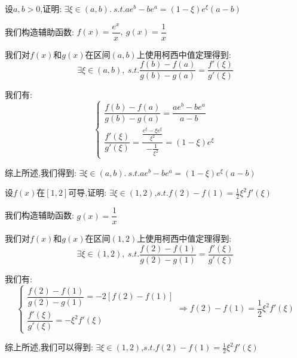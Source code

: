 \begin{proposition}
	设$a,b>0$,证明: $\exists \xi\in(a,b).\ s.t. ae^b-be^a=(1-\xi)e^{\xi}(a-b)$
\end{proposition}
\begin{solution}

	我们构造辅助函数: $f(x)=\dfrac{e^{x}}{x},\ g(x)=\dfrac{1}{x}$

	我们对$f(x)$和$g(x)$在区间$(a,b)$上使用柯西中值定理得到:
	$$\exists \xi\in(a,b),\ s.t. \dfrac{f(b)-f(a)}{g(b)-g(a)}=\dfrac{f'(\xi)}{g'(\xi)}$$

	我们有:
	$$\left\lbrace
		\begin{array}{l}
			\dfrac{f(b)-f(a)}{g(b)-g(a)}=\dfrac{ae^b-be^a}{a-b} \\
			\dfrac{f'(\xi)}{g'(\xi)}=\dfrac{\frac{e^{\xi}-\xi e^{\xi}}{\xi^2}}{-\frac{1}{\xi^2}}=(1-\xi)e^{\xi}
		\end{array}
		\right. $$

	综上所述,我们得到: $\exists \xi\in(a,b).\ s.t. ae^b-be^a=(1-\xi)e^{\xi}(a-b)$
\end{solution}


\begin{proposition}
	设$f(x)$在$[1,2]$可导,证明: $\exists \xi\in(1,2)$,$s.t. f(2)-f(1)=\frac{1}{2}\xi^2f'(\xi)$
\end{proposition}
\begin{solution}

	我们构造辅助函数: $g(x)=\dfrac{1}{x}$

	我们对$f(x)$和$g(x)$在区间$(1,2)$上使用柯西中值定理得到:
	$$\exists\xi\in(1,2),\ s.t. \dfrac{f(2)-f(1)}{g(2)-g(1)}=\dfrac{f'(\xi)}{g'(\xi)}$$

	我们有:
	$$\left\lbrace
		\begin{array}{l}
			\dfrac{f(2)-f(1)}{g(2)-g(1)}=-2[f(2)-f(1)] \\
			\dfrac{f'(\xi)}{g'(\xi)}=-\xi^2f'(\xi)
		\end{array}
		\right. \Rightarrow f(2)-f(1)=\frac{1}{2}\xi^2f'(\xi)$$

	综上所述,我们可以得到: $\exists \xi\in(1,2)$,$s.t. f(2)-f(1)=\frac{1}{2}\xi^2f'(\xi)$
\end{solution}


